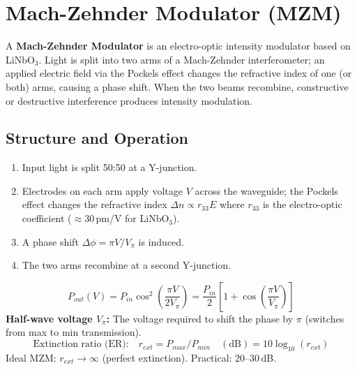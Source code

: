 \documentclass[12pt,a4paper]{article}
\begin{document}
\section{Mach-Zehnder Modulator (MZM)}

\begin{tcolorbox}[defbox, title={\textbf{Mach-Zehnder Modulator (MZM)}}]
A \textbf{Mach-Zehnder Modulator} is an electro-optic intensity modulator based on LiNbO$_3$. Light is split into two arms of a Mach-Zehnder interferometer; an applied electric field via the Pockels effect changes the refractive index of one (or both) arms, causing a phase shift. When the two beams recombine, constructive or destructive interference produces intensity modulation.
\end{tcolorbox}

\subsection{Structure and Operation}
\begin{enumerate}[leftmargin=*, itemsep=3pt, label=\textbf{\arabic*.}]
  \item Input light is split 50:50 at a Y-junction.
  \item Electrodes on each arm apply voltage $V$ across the waveguide; the Pockels effect changes the refractive index $\Delta n \propto r_{33} E$ where $r_{33}$ is the electro-optic coefficient ($\approx 30$\,pm/V for LiNbO$_3$).
  \item A phase shift $\Delta\phi = \pi V / V_\pi$ is induced.
  \item The two arms recombine at a second Y-junction.
\end{enumerate}

\begin{tcolorbox}[formulabox, title={\textbf{MZM Transfer Function}}]
\[
P_{out}(V) = P_{in} \cos^2\!\left(\frac{\pi V}{2V_\pi}\right) = \frac{P_{in}}{2}\left[1 + \cos\!\left(\frac{\pi V}{V_\pi}\right)\right]
\]
\textbf{Half-wave voltage $V_\pi$:} The voltage required to shift the phase by $\pi$ (switches from max to min transmission).
\[
\text{Extinction ratio (ER):} \quad r_{ext} = P_{max}/P_{min} \quad (\text{dB}) = 10\log_{10}(r_{ext})
\]
Ideal MZM: $r_{ext} \to \infty$ (perfect extinction). Practical: 20--30\,dB.
\end{tcolorbox}
\end{document}
